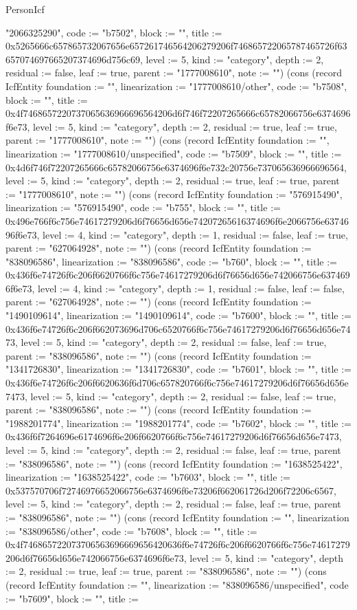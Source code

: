 \begin{lexlean}{PersonIcf}
\begin{semanticmodule}
{"2066325290", code := "b7502", block := "", title := 0x5265666c657865732067656e657261746564206279206f746865722065787465726f63657074697665207374696d756c69, level := 5, kind := "category", depth := 2, residual := false, leaf := true, parent := "1777008610", note := ""}) (cons (record IcfEntity {foundation := "", linearization := "1777008610/other", code := "b7508", block := "", title := 0x4f7468657220737065636966696564206d6f746f72207265666c65782066756e6374696f6e73, level := 5, kind := "category", depth := 2, residual := true, leaf := true, parent := "1777008610", note := ""}) (cons (record IcfEntity {foundation := "", linearization := "1777008610/unspecified", code := "b7509", block := "", title := 0x4d6f746f72207265666c65782066756e6374696f6e732c20756e737065636966696564, level := 5, kind := "category", depth := 2, residual := true, leaf := true, parent := "1777008610", note := ""}) (cons (record IcfEntity {foundation := "576915490", linearization := "576915490", code := "b755", block := "", title := 0x496e766f6c756e74617279206d6f76656d656e74207265616374696f6e2066756e6374696f6e73, level := 4, kind := "category", depth := 1, residual := false, leaf := true, parent := "627064928", note := ""}) (cons (record IcfEntity {foundation := "838096586", linearization := "838096586", code := "b760", block := "", title := 0x436f6e74726f6c206f6620766f6c756e74617279206d6f76656d656e742066756e6374696f6e73, level := 4, kind := "category", depth := 1, residual := false, leaf := false, parent := "627064928", note := ""}) (cons (record IcfEntity {foundation := "1490109614", linearization := "1490109614", code := "b7600", block := "", title := 0x436f6e74726f6c206f662073696d706c6520766f6c756e74617279206d6f76656d656e7473, level := 5, kind := "category", depth := 2, residual := false, leaf := true, parent := "838096586", note := ""}) (cons (record IcfEntity {foundation := "1341726830", linearization := "1341726830", code := "b7601", block := "", title := 0x436f6e74726f6c206f6620636f6d706c657820766f6c756e74617279206d6f76656d656e7473, level := 5, kind := "category", depth := 2, residual := false, leaf := true, parent := "838096586", note := ""}) (cons (record IcfEntity {foundation := "1988201774", linearization := "1988201774", code := "b7602", block := "", title := 0x436f6f7264696e6174696f6e206f6620766f6c756e74617279206d6f76656d656e7473, level := 5, kind := "category", depth := 2, residual := false, leaf := true, parent := "838096586", note := ""}) (cons (record IcfEntity {foundation := "1638525422", linearization := "1638525422", code := "b7603", block := "", title := 0x537570706f72746976652066756e6374696f6e73206f662061726d206f72206c6567, level := 5, kind := "category", depth := 2, residual := false, leaf := true, parent := "838096586", note := ""}) (cons (record IcfEntity {foundation := "", linearization := "838096586/other", code := "b7608", block := "", title := 0x4f746865722073706563696669656420636f6e74726f6c206f6620766f6c756e74617279206d6f76656d656e742066756e6374696f6e73, level := 5, kind := "category", depth := 2, residual := true, leaf := true, parent := "838096586", note := ""}) (cons (record IcfEntity {foundation := "", linearization := "838096586/unspecified", code := "b7609", block := "", title := }
\end{semanticmodule}
\end{lexlean}
